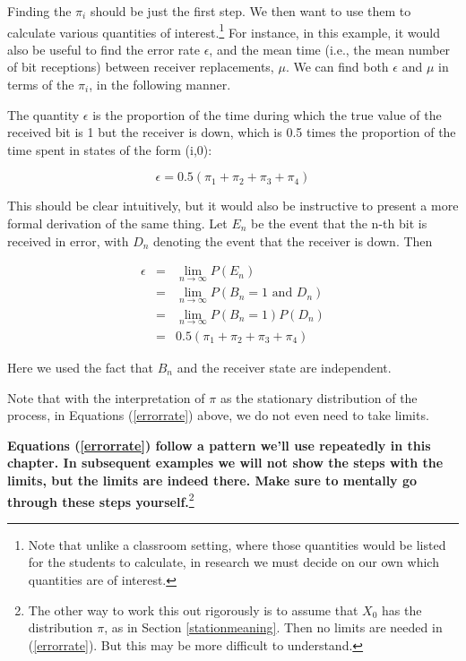 Finding the $\pi_{i}$ should be just the first step.  We then want to
use them to calculate various quantities of interest.\footnote{Note that
unlike a classroom setting, where those quantities would be listed for
the students to calculate, in research we must decide on our own which
quantities are of interest.} For instance, in this example, it would
also be useful to find the error rate $\epsilon$, and the mean time
(i.e., the mean number of bit receptions) between receiver replacements,
$\mu$. We can find both $\epsilon$ and $\mu$ in terms of the $\pi_{i}$,
in the following manner.

The quantity $\epsilon$ is the proportion of the time during which the
true value of the received bit is 1 but the receiver is down, which is
0.5 times the proportion of the time spent in states of the form (i,0):

\begin{equation}
\epsilon = 0.5 (\pi_{1}+\pi_{2}+\pi_{3}+\pi _{4})
\end{equation}

This should be clear intuitively, but it would also be instructive to
present a more formal derivation of the same thing.  Let $E_n$ be the
event that the n-th bit is received in error, with $D_n$ denoting the
event that the receiver is down.  Then

\begin{eqnarray}
\label{errorrate} 
\epsilon &=& \lim_{n \rightarrow \infty} P(E_n) \\
&=& \lim_{n \rightarrow \infty} P(B_n = 1 \textrm{ and } D_n) \\
&=& \lim_{n \rightarrow \infty} P(B_n = 1) P(D_n) \\
&=& 0.5 (\pi_{1}+\pi_{2}+\pi_{3}+\pi _{4})
\end{eqnarray}

Here we used the fact that $B_n$ and the receiver state are independent.

Note that with the interpretation of $\pi$ as the stationary
distribution of the process, in Equations (\ref{errorrate}) above, we
do not even need to take limits.

{\bf Equations (\ref{errorrate}) follow a pattern we'll use repeatedly
in this chapter.  In subsequent examples we will not show the steps with
the limits, but the limits are indeed there.  Make sure to mentally go
through these steps yourself.}\footnote{The other way to work this out
rigorously is to assume that $X_0$ has the distribution $\pi$,
as in Section \ref{stationmeaning}.  Then no limits are needed in
(\ref{errorrate}).  But this may be more difficult to understand.}

